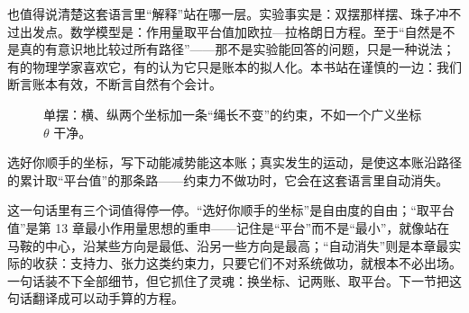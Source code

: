 \begin{mainline}
也值得说清楚这套语言里“解释”站在哪一层。实验事实是：双摆那样摆、珠子冲不过出发点。数学模型是：作用量取平台值加欧拉—拉格朗日方程。至于“自然是不是真的有意识地比较过所有路径”——那不是实验能回答的问题，只是一种说法；有的物理学家喜欢它，有的认为它只是账本的拟人化。本书站在谨慎的一边：我们断言账本有效，不断言自然有个会计。
\end{mainline}

\begin{figure}[htbp]
\centering
{}
\caption{单摆：横、纵两个坐标加一条“绳长不变”的约束，不如一个广义坐标 \(\theta\) 干净。}
\end{figure}


\begin{oneline}
选好你顺手的坐标，写下动能减势能这本账；真实发生的运动，是使这本账沿路径的累计取“平台值”的那条路——约束力不做功时，它会在这套语言里自动消失。
\end{oneline}

\begin{mainline}
这一句话里有三个词值得停一停。“选好你顺手的坐标”是自由度的自由；“取平台值”是第 13 章最小作用量思想的重申——记住是“平台”而不是“最小”，就像站在马鞍的中心，沿某些方向是最低、沿另一些方向是最高；“自动消失”则是本章最实际的收获：支持力、张力这类约束力，只要它们不对系统做功，就根本不必出场。一句话装不下全部细节，但它抓住了灵魂：换坐标、记两账、取平台。下一节把这句话翻译成可以动手算的方程。
\end{mainline}


